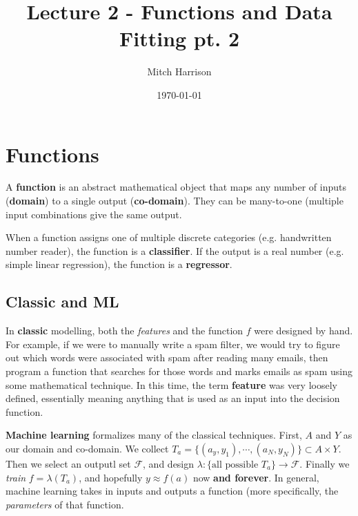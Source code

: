 \documentclass[titlepage, 12pt, leqno]{article}
\title{\Huge{Lecture 2 - Functions and Data Fitting pt. 2}}
\author{\large{Mitch Harrison}}
\date{\today}
\begin{document}
\setlength{\parskip}{1\baselineskip}
\setlength{\parindent}{15pt}
\maketitle
\tableofcontents
\newpage


\section{Functions}

\begin{definition}
    A \textbf{function} is an abstract mathematical object that maps any number of
    inputs (\textbf{domain}) to a single output (\textbf{co-domain}). They can 
    be many-to-one (multiple input combinations give the same output.
\end{definition}

\begin{definition}
    When a function assigns one of multiple discrete categories (e.g. handwritten
    number reader), the function is a \textbf{classifier}. If the output is a
    real number (e.g. simple linear regression), the function is a
    \textbf{regressor}.
\end{definition}

\subsection{Classic and ML}
In \textbf{classic} modelling, both the \textit{features} and the function $f$
were designed by hand. For example, if we were to manually write a spam filter,
we would try to figure out which words were associated with spam after reading
many emails, then program a function that searches for those words and marks 
emails as spam using some mathematical technique. In this time, the term
\textbf{feature} was very loosely defined, essentially meaning anything that is 
used as an input into the decision function.

\textbf{Machine learning} formalizes many of the classical techniques. First,
$A$ and $Y$ as our domain and co-domain. We collect $T_a = \{(a_y,y_1), \cdots 
,(a_N,y_N)\} \subset A \times Y$. Then we select an outputl set 
$\mathcal{F}$, and design $\lambda : \{ \text{all possible } T_a\} \rightarrow
\mathcal{F}$. Finally we \textit{train} $f = \lambda(T_a)$, and hopefully 
$y \approx f(a)$ now \textbf{and forever}. In general, machine learning takes in
inputs and outputs a function (more specifically, the \textit{parameters} of that
function.
\end{document}
